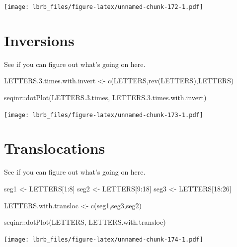 \documentclass[
]{book}
\newenvironment{Shaded}{\begin{snugshade}}{\end{snugshade}}
\newcommand{\DecValTok}[1]{\textcolor[rgb]{0.00,0.00,0.81}{#1}}
\newcommand{\FloatTok}[1]{\textcolor[rgb]{0.00,0.00,0.81}{#1}}
\newcommand{\FunctionTok}[1]{\textcolor[rgb]{0.00,0.00,0.00}{#1}}
\newcommand{\NormalTok}[1]{#1}
\newcommand{\OtherTok}[1]{\textcolor[rgb]{0.56,0.35,0.01}{#1}}
\newcommand{\SpecialCharTok}[1]{\textcolor[rgb]{0.00,0.00,0.00}{#1}}
\begin{document}
\texttt{[image: lbrb\_files/figure-latex/unnamed-chunk-172-1.pdf]}

\hypertarget{inversions}{%
\section{Inversions}\label{inversions}}

See if you can figure out what's going on here.

\begin{Shaded}
\begin{Highlighting}[]
\NormalTok{LETTERS.}\FloatTok{3.}\NormalTok{times.with.invert }\OtherTok{\textless{}{-}} \FunctionTok{c}\NormalTok{(LETTERS,}\FunctionTok{rev}\NormalTok{(LETTERS),LETTERS)}

\NormalTok{seqinr}\SpecialCharTok{::}\FunctionTok{dotPlot}\NormalTok{(LETTERS.}\FloatTok{3.}\NormalTok{times, }
\NormalTok{                LETTERS.}\FloatTok{3.}\NormalTok{times.with.invert)}
\end{Highlighting}
\end{Shaded}

\texttt{[image: lbrb\_files/figure-latex/unnamed-chunk-173-1.pdf]}

\hypertarget{translocations}{%
\section{Translocations}\label{translocations}}

See if you can figure out what's going on here.

\begin{Shaded}
\begin{Highlighting}[]
\NormalTok{seg1 }\OtherTok{\textless{}{-}}\NormalTok{ LETTERS[}\DecValTok{1}\SpecialCharTok{:}\DecValTok{8}\NormalTok{]}
\NormalTok{seg2 }\OtherTok{\textless{}{-}}\NormalTok{ LETTERS[}\DecValTok{9}\SpecialCharTok{:}\DecValTok{18}\NormalTok{]}
\NormalTok{seg3 }\OtherTok{\textless{}{-}}\NormalTok{ LETTERS[}\DecValTok{18}\SpecialCharTok{:}\DecValTok{26}\NormalTok{]}

\NormalTok{LETTERS.with.transloc }\OtherTok{\textless{}{-}} \FunctionTok{c}\NormalTok{(seg1,seg3,seg2)}

\NormalTok{seqinr}\SpecialCharTok{::}\FunctionTok{dotPlot}\NormalTok{(LETTERS, }
\NormalTok{                LETTERS.with.transloc)}
\end{Highlighting}
\end{Shaded}

\texttt{[image: lbrb\_files/figure-latex/unnamed-chunk-174-1.pdf]}
\end{document}
